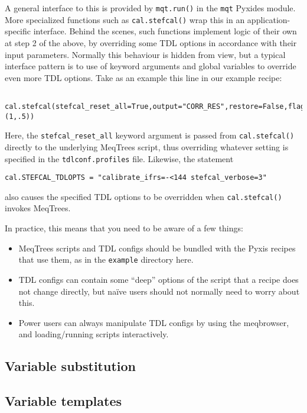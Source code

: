 \documentclass[a4paper,10pt]{article}
\begin{document}
A general interface to this is provided by {\tt mqt.run()} in the {\tt mqt} Pyxides module. More specialized functions such as {\tt cal.stefcal()} wrap this in an application-specific interface. Behind the scenes, such functions implement logic of their own at step 2 of the above, by overriding some TDL options in accordance with their input parameters. Normally this behaviour is hidden from view, but a typical interface pattern is to use of keyword arguments and global variables to override even more TDL options. Take as an example this line in our example recipe:

\begin{verbatim}
  cal.stefcal(stefcal_reset_all=True,output="CORR_RES",restore=False,flag_threshold=(1,.5))
\end{verbatim}

Here, the {\tt stefcal\_reset\_all} keyword argument is passed from {\tt cal.stefcal()} directly to the underlying MeqTrees script, thus overriding whatever setting is specified in the {\tt tdlconf.profiles} file. Likewise, the statement

\begin{verbatim}
cal.STEFCAL_TDLOPTS = "calibrate_ifrs=-<144 stefcal_verbose=3"
\end{verbatim}

also causes the specified TDL options to be overridden when {\tt cal.stefcal()} invokes MeqTrees.

In practice, this means that you need to be aware of a few things:

\begin{itemize}
\item MeqTrees scripts and TDL configs should be bundled with the Pyxis recipes that use them, as in the {\tt example} directory here.
\item TDL configs can contain some ``deep'' options of the script that a recipe does not change directly, but na\"ive users should not normally need to worry about this.
\item Power users can always manipulate TDL configs by using the meqbrowser, and loading/running scripts interactively.
\end{itemize}

\subsection{Variable substitution}
\label{sec:varsubst}

\subsection{Variable templates}
\end{document}
